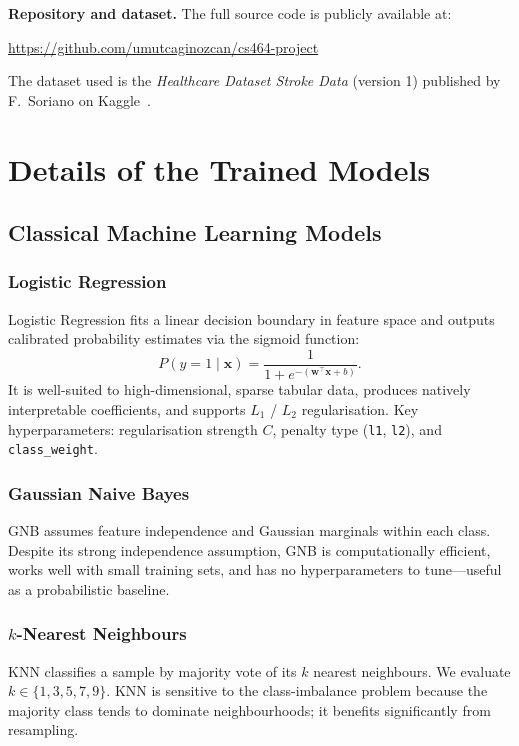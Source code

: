\documentclass[11pt,a4paper]{article}
\begin{document}
\noindent\textbf{Repository and dataset.}
The full source code is publicly available at:
\begin{center}
  \url{https://github.com/umutcaginozcan/cs464-project}
\end{center}
The dataset used is the \textit{Healthcare Dataset Stroke Data} (version 1) published by F.\ Soriano on Kaggle~\cite{fedesoriano2021stroke}.

\section{Details of the Trained Models}
\label{sec:models}

\subsection{Classical Machine Learning Models}

\subsubsection{Logistic Regression}
Logistic Regression fits a linear decision boundary in feature space and outputs calibrated probability estimates via the sigmoid function:
\[
  P(y=1 \mid \mathbf{x}) = \frac{1}{1+e^{-(\mathbf{w}^\top\mathbf{x}+b)}}.
\]
It is well-suited to high-dimensional, sparse tabular data, produces natively interpretable coefficients, and supports $L_1$ / $L_2$ regularisation.
Key hyperparameters: regularisation strength $C$, penalty type (\texttt{l1}, \texttt{l2}), and \texttt{class\_weight}.

\subsubsection{Gaussian Naive Bayes}
GNB assumes feature independence and Gaussian marginals within each class.
Despite its strong independence assumption, GNB is computationally efficient, works well with small training sets, and has no hyperparameters to tune—useful as a probabilistic baseline.

\subsubsection{$k$-Nearest Neighbours}
KNN classifies a sample by majority vote of its $k$ nearest neighbours.
We evaluate $k \in \{1, 3, 5, 7, 9\}$.
KNN is sensitive to the class-imbalance problem because the majority class tends to dominate neighbourhoods; it benefits significantly from resampling.
\end{document}
